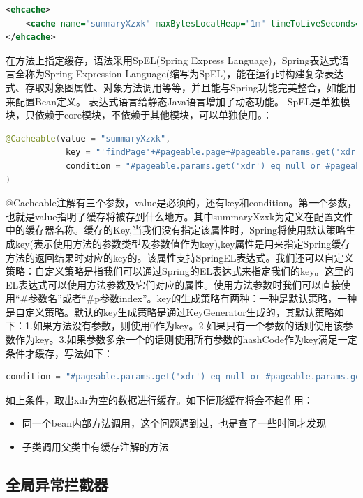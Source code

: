 \documentclass[letter]{book}
\begin{document}
\begin{lstlisting}[language=XML]
<ehcache>
	<cache name="summaryXzxk" maxBytesLocalHeap="1m" timeToLiveSeconds="200"/>
</ehcache>
\end{lstlisting}

在方法上指定缓存，语法采用SpEL(Spring Express Language)，Spring表达式语言全称为Spring Expression Language(缩写为SpEL)，能在运行时构建复杂表达式、存取对象图属性、对象方法调用等等，并且能与Spring功能完美整合，如能用来配置Bean定义。 表达式语言给静态Java语言增加了动态功能。
SpEL是单独模块，只依赖于core模块，不依赖于其他模块，可以单独使用。：

\begin{lstlisting}[language=Java]
@Cacheable(value = "summaryXzxk",
			key = "'findPage'+#pageable.page+#pageable.params.get('xdr')",
			condition = "#pageable.params.get('xdr') eq null or #pageable.params.get('xdr') eq ''"
)
\end{lstlisting}

@Cacheable注解有三个参数，value是必须的，还有key和condition。第一个参数，也就是value指明了缓存将被存到什么地方。其中summaryXzxk为定义在配置文件中的缓存器名称。缓存的Key,当我们没有指定该属性时，Spring将使用默认策略生成key(表示使用方法的参数类型及参数值作为key),key属性是用来指定Spring缓存方法的返回结果时对应的key的。该属性支持SpringEL表达式。我们还可以自定义策略：自定义策略是指我们可以通过Spring的EL表达式来指定我们的key。这里的EL表达式可以使用方法参数及它们对应的属性。使用方法参数时我们可以直接使用“\#参数名”或者“\#p参数index”。key的生成策略有两种：一种是默认策略，一种是自定义策略。默认的key生成策略是通过KeyGenerator生成的，其默认策略如下：1.如果方法没有参数，则使用0作为key。2.如果只有一个参数的话则使用该参数作为key。3.如果参数多余一个的话则使用所有参数的hashCode作为key满足一定条件才缓存，写法如下：

\begin{lstlisting}[language=Java]
condition = "#pageable.params.get('xdr') eq null or #pageable.params.get('xdr') eq ''"
\end{lstlisting}

如上条件，取出xdr为空的数据进行缓存。如下情形缓存将会不起作用：

\begin{itemize}
	\item{同一个bean内部方法调用，这个问题遇到过，也是查了一些时间才发现}
	\item{子类调用父类中有缓存注解的方法}
\end{itemize}

\subsection{全局异常拦截器}
\end{document}
